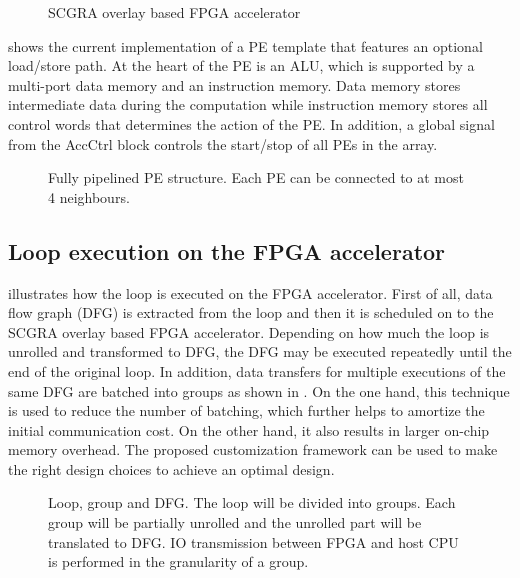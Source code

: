 \begin{figure}[tb]
\caption{SCGRA overlay based FPGA accelerator}
\label{fig:scgra-acc}
\end{figure}

 shows the current implementation of a 
PE template that features an optional load/store path. 
At the heart of the PE is an ALU, which is supported by a multi-port 
data memory and an instruction memory. Data memory stores intermediate data during the computation
while instruction memory stores all control words that determines the action of the PE. 
In addition, a global signal from the AccCtrl block controls the start/stop of all PEs in the array.

\begin{figure}[tb]
\center{\texttt{[image: pe]}}
\caption{Fully pipelined PE structure. Each PE can be connected to at most 4 neighbours.}
\label{fig:pe}
\end{figure}

\subsection{Loop execution on the FPGA accelerator}
 illustrates how the loop is executed 
on the FPGA accelerator. First of all, 
data flow graph (DFG) is extracted from the loop and then it 
is scheduled on to the SCGRA overlay based FPGA accelerator. 
Depending on how much the loop is unrolled and transformed 
to DFG, the DFG may be executed repeatedly until the end of 
the original loop. In addition, data transfers for 
multiple executions of the same DFG are batched into groups 
as shown in . On the one hand, this technique is used to 
reduce the number of batching, which further helps to amortize 
the initial communication cost. On the other hand, it also 
results in larger on-chip memory overhead. The proposed customization framework 
can be used to make the right design choices to achieve an optimal design. 

\begin{figure}[tb]
\caption{Loop, group and DFG. The loop will be divided into 
groups. Each group will be partially unrolled and the unrolled part will be 
translated to DFG. IO transmission between FPGA and host CPU is performed 
in the granularity of a group.}
\label{fig:group-dfg}
\end{figure}

